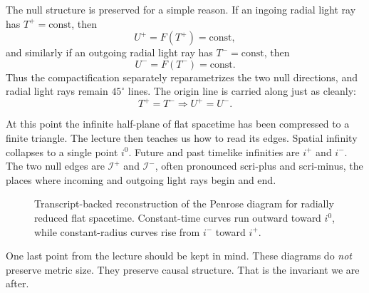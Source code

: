 The null structure is preserved for a simple reason. If an ingoing radial light ray has \(T^+=\text{const}\), then
\[
U^+=F(T^+)=\text{const},
\]
and similarly if an outgoing radial light ray has \(T^-=\text{const}\), then
\[
U^-=F(T^-)=\text{const}.
\]
Thus the compactification separately reparametrizes the two null directions, and radial light rays remain \(45^\circ\) lines. The origin line is carried along just as cleanly:
\[
T^+=T^- \Longrightarrow U^+=U^-.
\]

At this point the infinite half-plane of flat spacetime has been compressed to a finite triangle. The lecture then teaches us how to read its edges. Spatial infinity collapses to a single point \(i^0\). Future and past timelike infinities are \(i^+\) and \(i^-\). The two null edges are \(\mathscr I^+\) and \(\mathscr I^-\), often pronounced scri-plus and scri-minus, the places where incoming and outgoing light rays begin and end.

\begin{figure}[htbp]
\centering
{}
\caption{Transcript-backed reconstruction of the Penrose diagram for radially reduced flat spacetime. Constant-time curves run outward toward \(i^0\), while constant-radius curves rise from \(i^-\) toward \(i^+\).}
\end{figure}

One last point from the lecture should be kept in mind. These diagrams do \emph{not} preserve metric size. They preserve causal structure. That is the invariant we are after.

